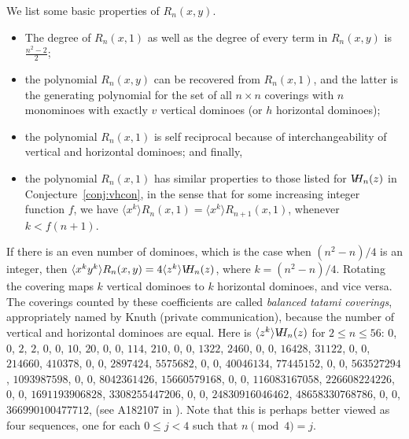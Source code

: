 \documentclass[12pt]{amsart}
\newcommand{\conref}[1]{Conjecture~\ref{conj:#1}}
\newcommand{\tabref}[1]{Table~\ref{tab:#1}}
\newcommand{\vd}{V}
\newcommand{\vh}{V\hspace{-5pt}H}
\begin{document}
%

We list some basic properties of $R_n(x,y)$.
\begin{itemize}
\item The degree of $R_n(x,1)$ as well as the degree of every term in
  $R_n(x,y)$ is $\frac{n^2-2}{2}$;
\item the polynomial $R_n(x,y)$ can be recovered from $R_n(x,1)$, and
  the latter is the generating polynomial for the set of all $n\times
  n$ coverings with $n$ monominoes with exactly $v$ vertical dominoes
  (or $h$ horizontal dominoes);
\item the polynomial $R_n(x,1)$ is self reciprocal because of
  interchangeability of vertical and horizontal dominoes; and finally,
\item the polynomial $R_n(x,1)$ has similar properties to those listed
  for $\vh_n(z)$ in \conref{vhcon}, in the sense that for some
  increasing integer function $f$, we have $\langle x^k\rangle
  R_{n}(x,1) = \langle x^k \rangle R_{n+1}(x,1)$, whenever $k<
  f(n+1)$.
\end{itemize}


If there is an even number of dominoes, which is the case when
$(n^2-n)/4$ is an integer, then $\langle x^ky^k \rangle R_n(x,y) =
4\coeff{k}\vh_n(z)$, where $k=(n^2-n)/4$. Rotating the covering maps
$k$ vertical dominoes to $k$ horizontal dominoes, and vice versa.  The
coverings counted by these coefficients are called \emph{balanced
  tatami coverings}, appropriately named by Knuth (private
communication), because the number of vertical and horizontal dominoes
are equal.  Here is $\coeff{k}\vh_n(z)$ for $2\le n \le 56$: $0$, $
0$, $ 2$, $ 2$, $ 0$, $ 0$, $ 10$, $ 20$, $ 0$, $ 0$, $ 114$, $ 210$,
$ 0$, $ 0$, $ 1322$, $ 2460$, $ 0$, $ 0$, $ 16428$, $ 31122$, $ 0$, $
0$, $ 214660$, $ 410378$, $ 0$, $ 0$, $ 2897424$, $ 5575682$, $ 0$, $
0$, $ 40046134$, $ 77445152$, $ 0$, $ 0$, $ 563527294$, $ 1093987598$,
$ 0$, $ 0$, $ 8042361426$, $ 15660579168$, $ 0$, $ 0$, $
116083167058$, $ 226608224226$, $ 0$, $ 0$, $ 1691193906828$, $
3308255447206$, $ 0$, $ 0$, $ 24830916046462$, $ 48658330768786$, $
0$, $ 0$, $366990100477712$, (see A182107 in \cite{Sloane}). Note that
this is perhaps better viewed as four sequences, one for each ${0\le j
< 4}$ such that $n \pmod 4 = j$.
\end{document}
